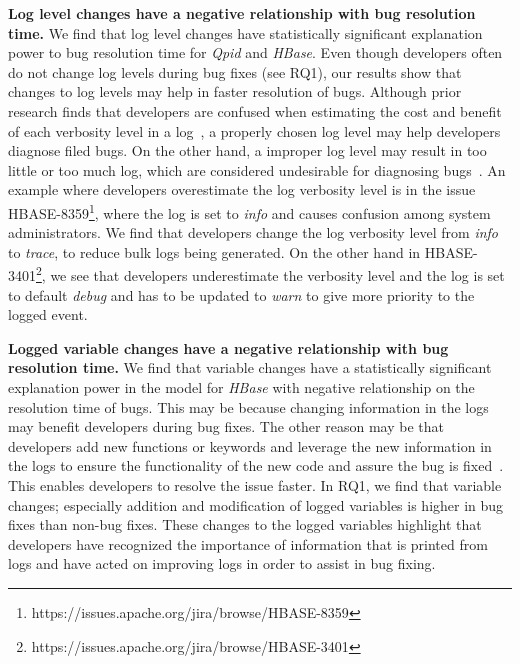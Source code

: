 \textbf{Log level changes have a negative relationship with bug resolution time.} 
We find that log level changes have statistically significant explanation power to bug resolution time for \emph{Qpid} and \emph{HBase}. Even though developers often do not change log levels during bug fixes (see RQ1), our results show that changes to log levels may help in faster resolution of bugs. Although prior research finds that developers are confused when estimating the cost and benefit of each verbosity level in a log~\cite{Characterizinglogs}, a properly chosen log level may help developers diagnose filed bugs. On the other hand, a improper log level may result in too little or too much log, which are considered undesirable for diagnosing bugs~\cite{zhao2014lprof,Fu1}. An example where developers overestimate the log verbosity level is in the issue HBASE-8359\footnote{https://issues.apache.org/jira/browse/HBASE-8359}, where the log is set to \emph{info} and causes confusion among system administrators. We find that developers change the log verbosity level from \emph{info} to \emph{trace}, to reduce bulk logs being generated. On the other hand in HBASE-3401\footnote{https://issues.apache.org/jira/browse/HBASE-3401}, we see that developers underestimate the verbosity level and the log is set to default \emph{debug} and has to be updated to \emph{warn} to give more priority to the logged event. 

\textbf{Logged variable changes have a negative relationship with bug resolution time.} 
We find that variable changes have a statistically significant explanation power in the model for \emph{HBase} with negative relationship on the resolution time of bugs. This may be because changing information in the logs may benefit developers during bug fixes. The other reason may be that developers add new functions or keywords and leverage the new information in the logs to ensure the functionality of the new code and assure the bug is fixed~\cite{Fu1}. This enables developers to resolve the issue faster. In RQ1, we find that variable changes; especially addition and modification of logged variables is higher in bug fixes than non-bug fixes. These changes to the logged variables highlight that developers have recognized the importance of information that is printed from logs and have acted on improving logs in order to assist in bug fixing.


